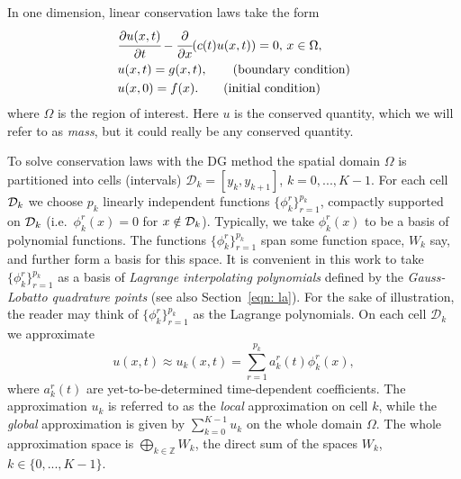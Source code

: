 In one dimension, linear conservation laws take the form 
\begin{align}
	&\cfrac{\partial u( x, t)}{\partial t} - \cfrac{\partial}{\partial x} ( c(t) u( x, t)) = 0,\,  x \in \Omega, \label{eqn: cons law}
	\\& u( x,t)= g( x,t),\tag{boundary condition}
	\\& u( x,0)=f( x).\tag{initial condition}
\end{align}
where \(\Omega\) is the region of interest. Here \(u\) is the conserved quantity, which we will refer to as \emph{mass}, but it could really be any conserved quantity. 

To solve conservation laws with the DG method the spatial domain \(\Omega\) is partitioned into cells (intervals) \(\mathcal D_k = [y_k,y_{k+1}]\), \(k=0,...,K-1\). For each cell \(\mathcal{D}_k\) we choose \(p_k\) linearly independent functions \(\{\phi^r_k\}_{r=1}^{p_k}\), compactly supported on \(\mathcal{D}_{k}\) (i.e.~\(\phi^r_k(x)=0\) for \(x\notin\mathcal{D}_{k}\)). Typically, we take \(\phi_k^r(x)\) to be a basis of polynomial functions. The functions \(\{\phi^r_k\}_{r=1}^{p_k}\) span some function space, \(W_k\) say, and further form a basis for this space. It is convenient in this work to take \(\{\phi^r_k\}_{r=1}^{p_k}\) as a basis of \emph{Lagrange interpolating polynomials} defined by the \emph{Gauss-Lobatto quadrature points} \citep{nodalDGBook} (see also Section~\ref{eqn: la}). For the sake of illustration, the reader may think of \(\{\phi^r_k\}_{r=1}^{p_k}\) as the Lagrange polynomials. On each cell \(\mathcal D_{k}\) we approximate 
\[u(x,t)\approx u_{k}(x,t)=\sum\limits_{r=1}^{p_k}a_{k}^r(t)\phi^r_k(x),\] 
where \(a_{k}^r(t)\) are yet-to-be-determined time-dependent coefficients. The approximation \(u_{k}\) is referred to as the \textit{local} approximation on cell \(k\), while the \textit{global} approximation is given by \(\sum\limits_{k=0}^{K-1} u_{k}\) on the whole domain \(\Omega\). The whole approximation space is \(\bigoplus\limits_{k\in\mathbb Z} W_k\), the direct sum of the spaces \(W_k\), \(k\in\{0,...,K-1\}\).

